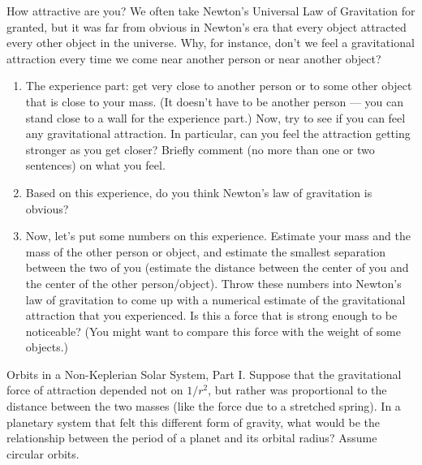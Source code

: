 \begin{aproblem}{How attractive are you?}
  We often take Newton's Universal Law of Gravitation for granted, but
  it was far from obvious in Newton's era that every object attracted
  every other object in the universe.  Why, for instance, don't we
  feel a gravitational attraction every time we come near another
  person or near another object?

  \begin{enumerate}
  \item The experience part: get very close to another person or to
    some other object that is close to your mass.  (It doesn't have to
    be another person --- you can stand close to a wall for the
    experience part.)  Now, try to see if you can feel any
    gravitational attraction.  In particular, can you feel the
    attraction getting stronger as you get closer?  Briefly comment
    (no more than one or two sentences) on what you feel.

  \item Based on this experience, do you think Newton's law of
    gravitation is obvious?

  \item Now, let's put some numbers on this experience.  Estimate your
    mass and the mass of the other person or object, and estimate the
    smallest separation between the two of you (estimate the distance
    between the center of you and the center of the other
    person/object).  Throw these numbers into Newton's law of
    gravitation to come up with a numerical estimate of the
    gravitational attraction that you experienced.  Is this a force
    that is strong enough to be noticeable?  (You might want to
    compare this force with the weight of some objects.)

  \end{enumerate}
\end{aproblem}


\begin{aproblem}{Orbits in a Non-Keplerian Solar System, Part I.}
  Suppose that the gravitational force of attraction depended not on
  $1/r^2$, but rather was proportional to the distance between the two
  masses (like the force due to a stretched spring).  In a planetary
  system that felt this different form of gravity, what would be the
  relationship between the period of a planet and its orbital radius?
  Assume circular orbits.
  \label{prob:nonkeplerI}
\end{aproblem}


